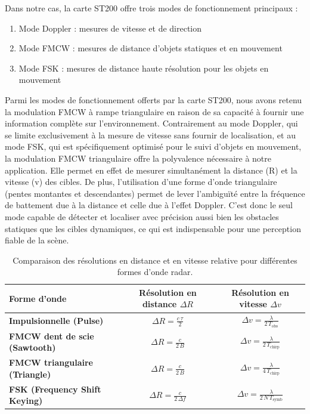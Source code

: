 Dans notre cas, la carte ST200 offre trois modes de fonctionnement principaux :
\begin{enumerate}
    \item Mode Doppler : mesures de vitesse et de direction
    \item Mode FMCW : mesures de distance d'objets statiques et en mouvement
    \item Mode FSK : mesures de distance haute résolution pour les objets en mouvement
\end{enumerate}
Parmi les modes de fonctionnement offerts par la carte ST200, nous avons retenu la modulation FMCW à rampe triangulaire en raison de sa capacité à fournir une information complète sur l'environnement. Contrairement au mode Doppler, qui se limite exclusivement à la mesure de vitesse sans fournir de localisation, et au mode FSK, qui est spécifiquement optimisé pour le suivi d'objets en mouvement, la modulation FMCW triangulaire offre la polyvalence nécessaire à notre application. Elle permet en effet de mesurer simultanément la distance (R) et la vitesse (v) des cibles. De plus, l'utilisation d'une forme d'onde triangulaire (pentes montantes et descendantes) permet de lever l'ambiguïté entre la fréquence de battement due à la distance et celle due à l'effet Doppler. C'est donc le seul mode capable de détecter et localiser avec précision aussi bien les obstacles statiques que les cibles dynamiques, ce qui est indispensable pour une perception fiable de la scène.


\begin{table}[h!]
\centering
\renewcommand{\arraystretch}{1.3}
\begin{tabular}{|l|c|c|}
\hline
\textbf{Forme d’onde} & \textbf{Résolution en distance $\Delta R$} & \textbf{Résolution en vitesse $\Delta v$} \\
\hline
\textbf{Impulsionnelle (Pulse)} 
& $\displaystyle \Delta R = \frac{c\,\tau}{2}$ 
& $\displaystyle \Delta v = \frac{\lambda}{2\,T_{\text{obs}}}$ \\ 
\hline
\textbf{FMCW dent de scie (Sawtooth)} 
& $\displaystyle \Delta R = \frac{c}{2\,B}$ 
& $\displaystyle \Delta v = \frac{\lambda}{2\,T_{\text{chirp}}}$ \\
\hline
\textbf{FMCW triangulaire (Triangle)} 
& $\displaystyle \Delta R = \frac{c}{2\,B}$ 
& $\displaystyle \Delta v = \frac{\lambda}{4\,T_{\text{chirp}}}$ \\
\hline
\textbf{FSK (Frequency Shift Keying)} 
& $\displaystyle \Delta R = \frac{c}{2\,\Delta f}$ 
& $\displaystyle \Delta v = \frac{\lambda}{2\,N\,T_{\text{symb}}}$ \\
\hline
\end{tabular}
\caption{Comparaison des résolutions en distance et en vitesse relative pour différentes formes d’onde radar.}
\label{tab:resolutions}
\end{table}

